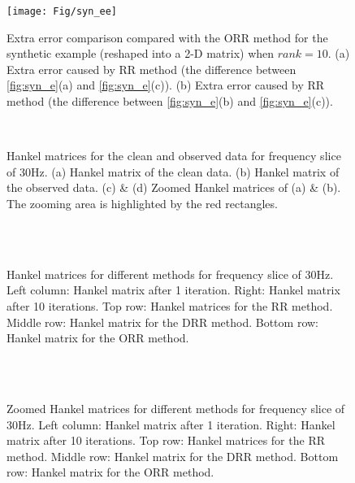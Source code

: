 {\begin{figure}
	\centering
	\texttt{[image: Fig/syn\_ee]}
	\caption{Extra error comparison compared with the ORR method for the synthetic example (reshaped into a 2-D matrix) when $rank=10$. (a) Extra error caused by RR method (the difference between \ref{fig:syn_e}(a) and \ref{fig:syn_e}(c)). (b) Extra error caused by RR method (the difference between \ref{fig:syn_e}(b) and \ref{fig:syn_e}(c)). }
	\label{fig:syn_ee}
\end{figure}

\begin{figure}
	\centering
    \\
	\caption{Hankel matrices for the clean and observed data for frequency slice of 30Hz. (a) Hankel matrix of the clean data. (b) Hankel matrix of the observed data. (c) \& (d) Zoomed Hankel matrices of (a) \& (b). The zooming area is highlighted by the red rectangles.}
	\label{fig:HH}
\end{figure}

\begin{figure}
	\centering
    \\
    \\
	\caption{Hankel matrices for different methods for frequency slice of 30Hz. Left column: Hankel matrix after 1 iteration. Right: Hankel matrix after 10 iterations. Top row: Hankel matrices for the RR method. Middle row: Hankel matrix for the DRR method. Bottom row: Hankel matrix for the ORR method.}
	\label{fig:Hs}
\end{figure}

\begin{figure}
	\centering
    \\
    \\
	\caption{Zoomed Hankel matrices for different methods for frequency slice of 30Hz. Left column: Hankel matrix after 1 iteration. Right: Hankel matrix after 10 iterations. Top row: Hankel matrices for the RR method. Middle row: Hankel matrix for the DRR method. Bottom row: Hankel matrix for the ORR method.}
	\label{fig:Hsz}
\end{figure}

}
